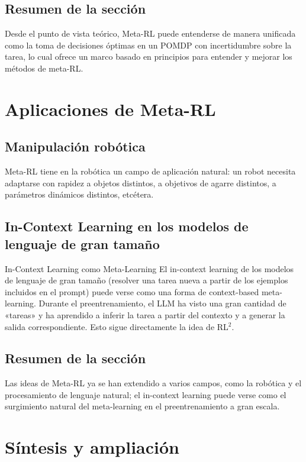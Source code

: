 \documentclass[a4paper]{article}
\begin{document}
\subsection{Resumen de la sección}

Desde el punto de vista teórico, Meta-RL puede entenderse de manera unificada como la toma de decisiones óptimas en un POMDP con incertidumbre sobre la tarea, lo cual ofrece un marco basado en principios para entender y mejorar los métodos de meta-RL.

\section{Aplicaciones de Meta-RL}

\subsection{Manipulación robótica}

Meta-RL tiene en la robótica un campo de aplicación natural: un robot necesita adaptarse con rapidez a objetos distintos, a objetivos de agarre distintos, a parámetros dinámicos distintos, etcétera.

\subsection{In-Context Learning en los modelos de lenguaje de gran tamaño}

\begin{knowledgebox}{In-Context Learning como Meta-Learning}
El in-context learning de los modelos de lenguaje de gran tamaño (resolver una tarea nueva a partir de los ejemplos incluidos en el prompt) puede verse como una forma de context-based meta-learning. Durante el preentrenamiento, el LLM ha visto una gran cantidad de «tareas» y ha aprendido a inferir la tarea a partir del contexto y a generar la salida correspondiente. Esto sigue directamente la idea de RL$^2$.
\end{knowledgebox}

\subsection{Resumen de la sección}

Las ideas de Meta-RL ya se han extendido a varios campos, como la robótica y el procesamiento de lenguaje natural; el in-context learning puede verse como el surgimiento natural del meta-learning en el preentrenamiento a gran escala.
\section{Síntesis y ampliación}
\end{document}
